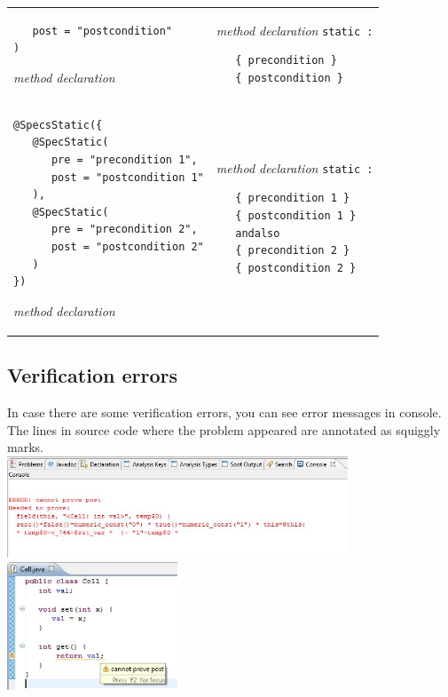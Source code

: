 \documentclass{article}
\begin{document}
\begin{longtable}{ m{7cm} | m{5cm} }
\begin{verbatim}
   post = "postcondition"
)
\end{verbatim}
\it{method declaration}
&
{\it method declaration} \texttt{static :}
\begin{verbatim}
   { precondition }
   { postcondition }
\end{verbatim}
\\
\begin{verbatim}
@SpecsStatic({
   @SpecStatic(
      pre = "precondition 1", 
      post = "postcondition 1"
   ),
   @SpecStatic(
      pre = "precondition 2", 
      post = "postcondition 2"
   )
})
\end{verbatim}
\it{method declaration}
&
{\it method declaration} \texttt{static :}
\begin{verbatim}
   { precondition 1 }
   { postcondition 1 }
   andalso
   { precondition 2 }
   { postcondition 2 }
\end{verbatim}
\end{longtable}

\subsection* {Verification errors}

In case there are some verification errors, you can see error messages in console. The lines in source code where the problem appeared are annotated as squiggly marks.\\

\includegraphics[width=4in]{images/console.jpg}\\

\includegraphics[width=2in]{images/marker.jpg}
\end{document}
